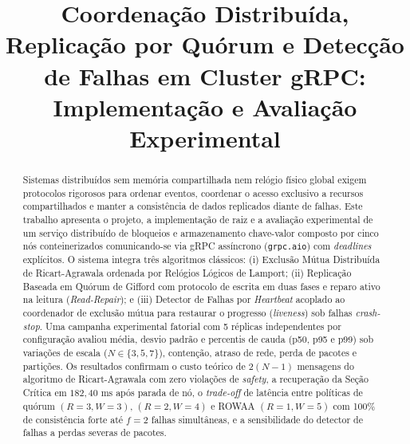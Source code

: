 \documentclass[conference,10pt]{IEEEtran}
\begin{document}
\title{Coordenação Distribuída, Replicação por Quórum e Detecção de Falhas em Cluster gRPC: Implementação e Avaliação Experimental}

\author{
}

\maketitle

\begin{abstract}
Sistemas distribuídos sem memória compartilhada nem relógio físico global exigem protocolos rigorosos para ordenar eventos, coordenar o acesso exclusivo a recursos compartilhados e manter a consistência de dados replicados diante de falhas. Este trabalho apresenta o projeto, a implementação de raiz e a avaliação experimental de um serviço distribuído de bloqueios e armazenamento chave-valor composto por cinco nós conteinerizados comunicando-se via gRPC assíncrono (\texttt{grpc.aio}) com \textit{deadlines} explícitos. O sistema integra três algoritmos clássicos: (i) Exclusão Mútua Distribuída de Ricart-Agrawala ordenada por Relógios Lógicos de Lamport; (ii) Replicação Baseada em Quórum de Gifford com protocolo de escrita em duas fases e reparo ativo na leitura (\textit{Read-Repair}); e (iii) Detector de Falhas por \textit{Heartbeat} acoplado ao coordenador de exclusão mútua para restaurar o progresso (\textit{liveness}) sob falhas \textit{crash-stop}. Uma campanha experimental fatorial com 5 réplicas independentes por configuração avaliou média, desvio padrão e percentis de cauda (p50, p95 e p99) sob variações de escala ($N \in \{3,5,7\}$), contenção, atraso de rede, perda de pacotes e partições. Os resultados confirmam o custo teórico de $2(N-1)$ mensagens do algoritmo de Ricart-Agrawala com zero violações de \textit{safety}, a recuperação da Seção Crítica em $182,40\text{ ms}$ após parada de nó, o \textit{trade-off} de latência entre políticas de quórum $(R=3,W=3)$, $(R=2,W=4)$ e ROWAA $(R=1,W=5)$ com 100\% de consistência forte até $f=2$ falhas simultâneas, e a sensibilidade do detector de falhas a perdas severas de pacotes.
\end{abstract}
\end{document}
